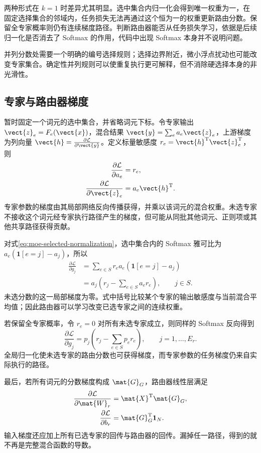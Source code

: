 \documentclass[../textbook.tex]{subfiles}
\begin{document}
两种形式在 $k=1$ 时差异尤其明显。选中集合内归一化会得到唯一权重为一，在固定选择集合的邻域内，任务损失无法再通过这个恒为一的权重更新路由分数。保留全专家概率则仍有连续梯度路径。判断路由器能否从任务损失学习，依据是后续归一化是否消去了 Softmax 的作用，代码中出现 Softmax 本身并不说明问题。

并列分数处需要一个明确的编号选择规则；选择边界附近，微小浮点扰动也可能改变专家集合。确定性并列规则可以使重复执行更可解释，但不消除硬选择本身的非光滑性。

\subsection{专家与路由器梯度}
暂时固定一个词元的选中集合，并省略词元下标。令专家输出 $\vect{z}_e=F_e(\vect{x})$，混合结果 $\vect{y}=\sum_ea_e\vect{z}_e$，上游梯度为列向量 $\vect{h}=\frac{\partial\mathcal L}{\partial \vect{y}}$。定义标量敏感度 $r_e=\vect{h}^{\mathrm{T}}\vect{z}_e^{\mathrm{T}}$，则
\begin{equation}
\begin{aligned}
 \frac{\partial\mathcal L}{\partial a_e} &= r_e, \\
 \frac{\partial\mathcal L}{\partial \vect{z}_e} &= a_e\vect{h}^{\mathrm{T}}.
\end{aligned}
\end{equation}
专家参数的梯度由其局部网络反向传播获得，并乘以该词元的混合权重。未选专家不接收这个词元经专家执行路径产生的梯度，但可能从同批其他词元、正则项或其他共享路径获得贡献。

对式\eqref{eq:moe-selected-normalization}，选中集合内的 Softmax 雅可比为 $a_e(\mathbf1[e=j]-a_j)$，所以
\begin{align}
 \frac{\partial\mathcal L}{\partial g_j}
 &=\sum_{e\in S}r_ea_e(\mathbf1[e=j]-a_j)\\
 &=a_j\left(r_j-\sum_{e\in S}a_er_e\right),\qquad j\in S.
 \label{eq:moe-router-grad}
\end{align}
未选分数的这一局部梯度为零。式中括号比较某个专家的输出敏感度与当前混合平均值；因此路由器可以学习改变已选专家之间的连续权重。

若保留全专家概率，令 $r_e=0$ 对所有未选专家成立，则同样的 Softmax 反向得到
\begin{equation}
 \frac{\partial\mathcal L}{\partial g_j}
 =p_j\left(r_j-\sum_{e\in S}p_er_e\right),\qquad j=1,\ldots,E_r.
\end{equation}
全局归一化使未选专家的路由分数也可获得梯度，而专家参数的任务梯度仍来自实际执行的路径。

最后，若所有词元的分数梯度构成 $\mat{G}_G$，路由器线性层满足
\begin{equation}
\begin{aligned}
 \frac{\partial\mathcal L}{\partial \mat{W}_r} &= \mat{X}^{\mathrm{T}}\mat{G}_G, \\
 \frac{\partial\mathcal L}{\partial b_r} &= \mat{G}_G^{\mathrm{T}}\mathbf1_N.
\end{aligned}
\end{equation}
输入梯度还应加上所有已选专家的回传与路由器的回传。漏掉任一路径，得到的就不再是完整混合函数的导数。
\end{document}
